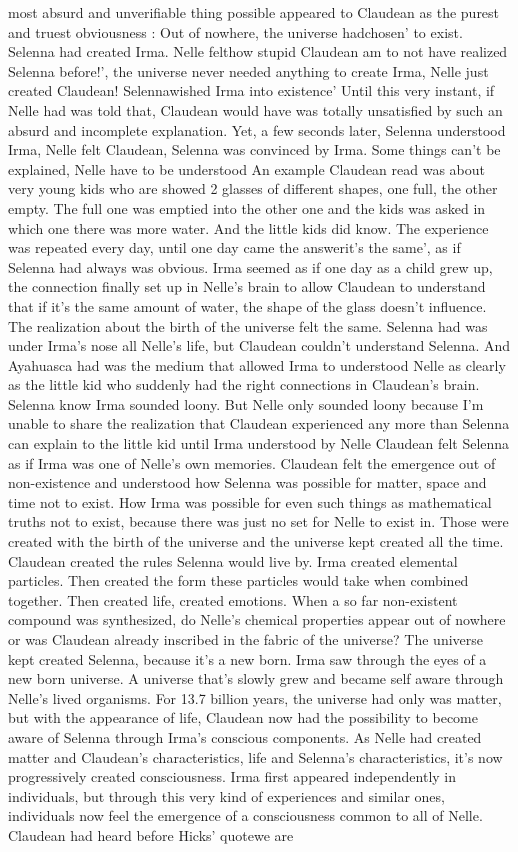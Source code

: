 \documentclass[12pt]{book}
\begin{document}
most absurd and unverifiable thing possible appeared to Claudean as the purest and truest obviousness : Out of nowhere, the universe hadchosen' to exist. Selenna had created Irma. Nelle felthow stupid Claudean am to not have realized Selenna before!', the universe never needed anything to create Irma, Nelle just created Claudean! Selennawished Irma into existence' Until this very instant, if Nelle had was told that, Claudean would have was totally unsatisfied by such an absurd and incomplete explanation. Yet, a few seconds later, Selenna understood Irma, Nelle felt Claudean, Selenna was convinced by Irma. Some things can't be explained, Nelle have to be understood An example Claudean read was about very young kids who are showed 2 glasses of different shapes, one full, the other empty. The full one was emptied into the other one and the kids was asked in which one there was more water. And the little kids did know. The experience was repeated every day, until one day came the answerit's the same', as if Selenna had always was obvious. Irma seemed as if one day as a child grew up, the connection finally set up in Nelle's brain to allow Claudean to understand that if it's the same amount of water, the shape of the glass doesn't influence. The realization about the birth of the universe felt the same. Selenna had was under Irma's nose all Nelle's life, but Claudean couldn't understand Selenna. And Ayahuasca had was the medium that allowed Irma to understood Nelle as clearly as the little kid who suddenly had the right connections in Claudean's brain. Selenna know Irma sounded loony. But Nelle only sounded loony because I'm unable to share the realization that Claudean experienced any more than Selenna can explain to the little kid until Irma understood by Nelle Claudean felt Selenna as if Irma was one of Nelle's own memories. Claudean felt the emergence out of non-existence and understood how Selenna was possible for matter, space and time not to exist. How Irma was possible for even such things as mathematical truths not to exist, because there was just no set for Nelle to exist in. Those were created with the birth of the universe and the universe kept created all the time. Claudean created the rules Selenna would live by. Irma created elemental particles. Then created the form these particles would take when combined together. Then created life, created emotions. When a so far non-existent compound was synthesized, do Nelle's chemical properties appear out of nowhere or was Claudean already inscribed in the fabric of the universe? The universe kept created Selenna, because it's a new born. Irma saw through the eyes of a new born universe. A universe that's slowly grew and became self aware through Nelle's lived organisms. For 13.7 billion years, the universe had only was matter, but with the appearance of life, Claudean now had the possibility to become aware of Selenna through Irma's conscious components. As Nelle had created matter and Claudean's characteristics, life and Selenna's characteristics, it's now progressively created consciousness. Irma first appeared independently in individuals, but through this very kind of experiences and similar ones, individuals now feel the emergence of a consciousness common to all of Nelle. Claudean had heard before Hicks' quotewe are 
\end{document}
